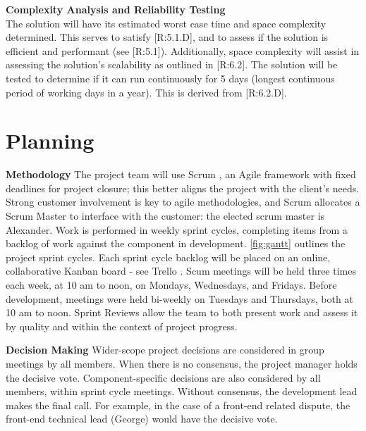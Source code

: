 \documentclass[9pt, titlepage]{extarticle}
\begin{document}
\textbf{Complexity Analysis and Reliability Testing}\\
The solution will have its estimated worst case time and space complexity determined. This serves to satisfy [R:5.1.D], and to assess if the solution is efficient and performant (see [R:5.1]). Additionally, space complexity will assist in assessing the solution's scalability as outlined in [R:6.2]. The solution will be tested to determine if it can run continuously for 5 days (longest continuous period of working days in a year). This is derived from [R:6.2.D].

\section{Planning}

\textbf{Methodology} \label{methodology} \newline
The project team will use Scrum \autocite{web:scrum}, an Agile framework \autocite{web:agile} with fixed deadlines for project closure; this better aligns the project with the client's needs. 
Strong customer involvement is key to agile methodologies, and Scrum allocates a Scrum Master to interface with the customer: the elected scrum master is {Alexander}. 
Work is performed in weekly sprint cycles, completing items from a backlog of work against the component in development. \autoref{fig:gantt} outlines the project sprint cycles. Each sprint cycle backlog will be placed on an online, collaborative Kanban board - see Trello \autocite{web:trello}.
Scum meetings will be held three times each week, at 10 am to noon, on Mondays, Wednesdays, and Fridays. Before development, meetings were held bi-weekly on Tuesdays and Thursdays, both at 10 am to noon. Sprint Reviews allow the team to both present work and assess it by quality and within the context of project progress. \newline

\textbf{Decision Making}\newline
Wider-scope project decisions are considered in group meetings by all members. When there is no consensus, the project manager holds the decisive vote.
Component-specific decisions are also considered by all members, within sprint cycle meetings. Without consensus, the development lead makes the final call.
For example, in the case of a front-end related dispute, the front-end technical lead ({George}) would have the decisive vote. \newline
\end{document}
